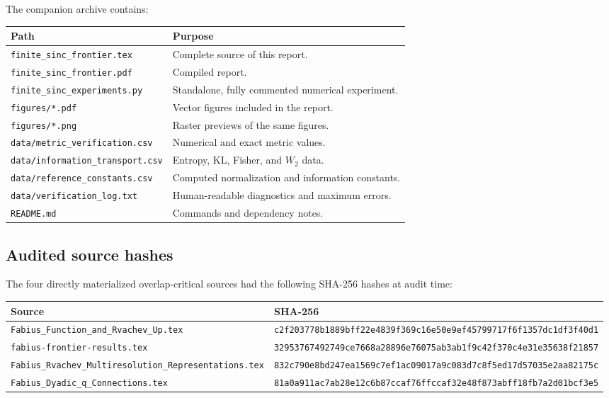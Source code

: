 \documentclass[11pt,oneside]{article}
\numberwithin{equation}{section}
\theoremstyle{definition}
\theoremstyle{remark}
\begin{document}
The companion archive contains:

\begin{longtable}{@{}p{}p{}@{}}
\toprule
Path & Purpose\\
\midrule
\texttt{finite\_sinc\_frontier.tex} & Complete source of this report.\\
\texttt{finite\_sinc\_frontier.pdf} & Compiled report.\\
\texttt{finite\_sinc\_experiments.py} & Standalone, fully commented numerical experiment.\\
\texttt{figures/*.pdf} & Vector figures included in the report.\\
\texttt{figures/*.png} & Raster previews of the same figures.\\
\texttt{data/metric\_verification.csv} & Numerical and exact metric values.\\
\texttt{data/information\_transport.csv} & Entropy, KL, Fisher, and $W_2$ data.\\
\texttt{data/reference\_constants.csv} & Computed normalization and information constants.\\
\texttt{data/verification\_log.txt} & Human-readable diagnostics and maximum errors.\\
\texttt{README.md} & Commands and dependency notes.\\
\bottomrule
\end{longtable}

\subsection{Audited source hashes}

The four directly materialized overlap-critical sources had the following SHA-256 hashes at audit time:

\begin{longtable}{@{}p{}p{}@{}}
\toprule
Source & SHA-256\\
\midrule
\nolinkurl{Fabius_Function_and_Rvachev_Up.tex} & \nolinkurl{c2f203778b1889bff22e4839f369c16e50e9ef45799717f6f1357dc1df3f40d1}\\
\nolinkurl{fabius-frontier-results.tex} & \nolinkurl{32953767492749ce7668a28896e76075ab3ab1f9c42f370c4e31e35638f21857}\\
\nolinkurl{Fabius_Rvachev_Multiresolution_Representations.tex} & \nolinkurl{832c790e8bd247ea1569c7ef1ac09017a9c083d7c8f5ed17d57035e2aa82175c}\\
\nolinkurl{Fabius_Dyadic_q_Connections.tex} & \nolinkurl{81a0a911ac7ab28e12c6b87ccaf76ffccaf32e48f873abff18fb7a2d01bcf3e5}\\
\bottomrule
\end{longtable}
\end{document}
